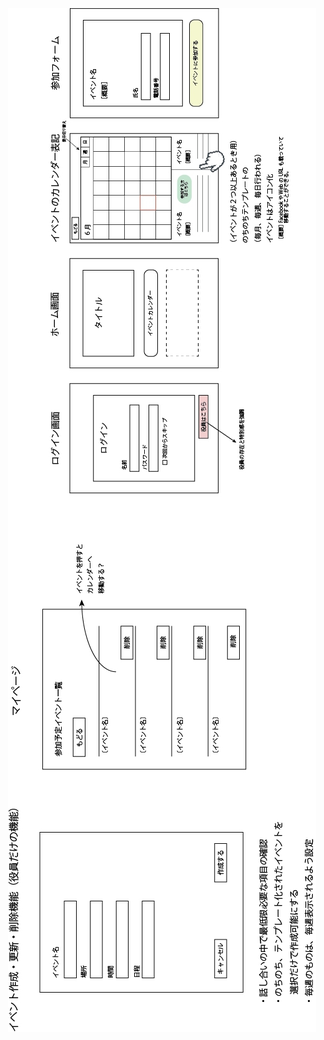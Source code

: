 \begin{figure}[ht]
    \begin{center}
    \includegraphics[keepaspectratio, scale=0.38]{appendixs/appendixA-2.jpg}
    \end{center}
\end{figure}
